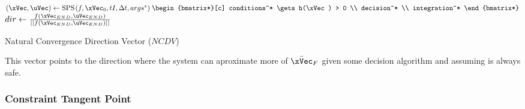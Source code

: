 

  \begin{algorithm}
    $(\xVec, \uVec) \gets \text{SPS}\hspace{0.1em}(f, \xVec_0, tI, \Delta t, args^*) \hspace{0.25em} \begin{bmatrix*}[c]  conditions^* \gets h(\xVec) > 0 \\ decision^* \\ integration^* \end{bmatrix*}$  
    $dir \gets \frac{f(\xVec_{END}, \uVec_{END})}{||f(\xVec_{END}, \uVec_{END})||}$ 
    \caption{Natural Convergence Direction Vector (\(NCDV\))} \label{alg:Natural_Convergence_Direction_Vector}
  \end{algorithm}

  This vector points to the direction where the system can aproximate more of \(\bar{\xVec}_F\) given some decision algorithm and assuming is always safe.


\subsubsection{Constraint Tangent Point}
\label{subsubsec:Constraint_Tangent_Point}

